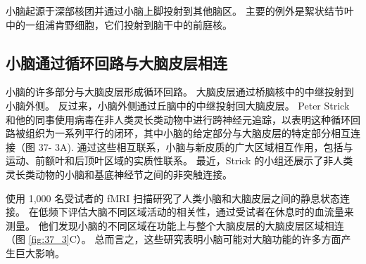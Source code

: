 小脑起源于深部核团并通过小脑上脚投射到其他脑区。 主要的例外是絮状结节叶中的一组浦肯野细胞，它们投射到脑干中的前庭核。

\subsection{小脑通过循环回路与大脑皮层相连}
小脑的许多部分与大脑皮层形成循环回路。 大脑皮层通过桥脑核中的中继投射到小脑外侧。 反过来，小脑外侧通过丘脑中的中继投射回大脑皮层。 Peter Strick 和他的同事使用病毒在非人类灵长类动物中进行跨神经元追踪，以表明这种循环回路被组织为一系列平行的闭环，其中小脑的给定部分与大脑皮层的特定部分相互连接（图 37- 3A). 通过这些相互联系，小脑与新皮质的广大区域相互作用，包括与运动、前额叶和后顶叶区域的实质性联系。 最近，Strick 的小组还展示了非人类灵长类动物的小脑和基底神经节之间的非突触连接。

使用 1,000 名受试者的 fMRI 扫描研究了人类小脑和大脑皮层之间的静息状态连接。 在低频下评估大脑不同区域活动的相关性，通过受试者在休息时的血流量来测量。 
他们发现小脑的不同区域在功能上与整个大脑皮层的大脑皮层区域相连（图 \ref{fig:37_3}C）。 
总而言之，这些研究表明小脑可能对大脑功能的许多方面产生巨大影响。


